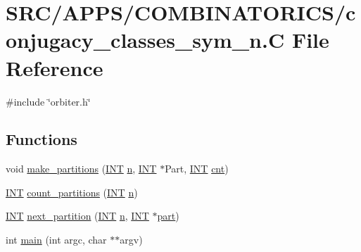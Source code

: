 \hypertarget{conjugacy__classes__sym__n_8_c}{}\section{S\+R\+C/\+A\+P\+P\+S/\+C\+O\+M\+B\+I\+N\+A\+T\+O\+R\+I\+C\+S/conjugacy\+\_\+classes\+\_\+sym\+\_\+n.C File Reference}
\label{conjugacy__classes__sym__n_8_c}
{\ttfamily \#include \char`\"{}orbiter.\+h\char`\"{}}\newline
\subsection*{Functions}
\begin{DoxyCompactItemize}
\item 
void \mbox{\hyperlink{conjugacy__classes__sym__n_8_c_a1aa2e0fef1529e491aa6039f1e180e9b}{make\+\_\+partitions}} (\mbox{\hyperlink{galois_8h_a09fddde158a3a20bd2dcadb609de11dc}{I\+NT}} \mbox{\hyperlink{simeon_8_c_a7f2cd26777ce0ff3fdaf8d02aacbddfb}{n}}, \mbox{\hyperlink{galois_8h_a09fddde158a3a20bd2dcadb609de11dc}{I\+NT}} $\ast$Part, \mbox{\hyperlink{galois_8h_a09fddde158a3a20bd2dcadb609de11dc}{I\+NT}} \mbox{\hyperlink{subsets_8_c_a9cfbb269728dc4185236d28be58d9eab}{cnt}})
\item 
\mbox{\hyperlink{galois_8h_a09fddde158a3a20bd2dcadb609de11dc}{I\+NT}} \mbox{\hyperlink{conjugacy__classes__sym__n_8_c_adffbb5d61d9f4bdafc31862760145403}{count\+\_\+partitions}} (\mbox{\hyperlink{galois_8h_a09fddde158a3a20bd2dcadb609de11dc}{I\+NT}} \mbox{\hyperlink{simeon_8_c_a7f2cd26777ce0ff3fdaf8d02aacbddfb}{n}})
\item 
\mbox{\hyperlink{galois_8h_a09fddde158a3a20bd2dcadb609de11dc}{I\+NT}} \mbox{\hyperlink{conjugacy__classes__sym__n_8_c_a1cc81054807e5c72ff35f4b82ff48fcb}{next\+\_\+partition}} (\mbox{\hyperlink{galois_8h_a09fddde158a3a20bd2dcadb609de11dc}{I\+NT}} \mbox{\hyperlink{simeon_8_c_a7f2cd26777ce0ff3fdaf8d02aacbddfb}{n}}, \mbox{\hyperlink{galois_8h_a09fddde158a3a20bd2dcadb609de11dc}{I\+NT}} $\ast$\mbox{\hyperlink{tdo__refine__all_8_c_af32a7ef139fc39ca4f560f3a90a83b89}{part}})
\item 
int \mbox{\hyperlink{conjugacy__classes__sym__n_8_c_a3c04138a5bfe5d72780bb7e82a18e627}{main}} (int argc, char $\ast$$\ast$argv)
\end{DoxyCompactItemize}


